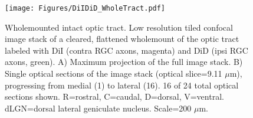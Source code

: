 \begin{figure}[hbtp]
    \begin{center}
        \texttt{[image: Figures/DiIDiD\_WholeTract.pdf]}
        \caption[Wholemounted intact optic tract.]
        {Wholemounted intact optic tract.
        Low resolution tiled confocal image stack of a cleared, flattened wholemount of the optic tract labeled with DiI (contra RGC axons, magenta) and DiD (ipsi RGC axons, green).
        A) Maximum projection of the full image stack.
        B) Single optical sections of the image stack (optical slice=9.11 $\mu$m), progressing from medial (1) to lateral (16).
        16 of 24 total optical sections shown.
        R=rostral, C=caudal, D=dorsal, V=ventral.
        dLGN=dorsal lateral geniculate nucleus.
        Scale=200 $\mu$m.
        }
        \label{Figures/DiIDiDWholeTract}
    \end{center}
\end{figure}

